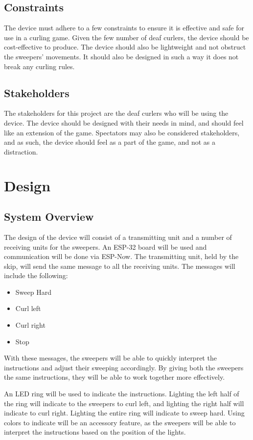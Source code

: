 \documentclass{article}
\begin{document}
\subsection{Constraints}

The device must adhere to a few constraints to ensure it is effective and safe for use in a curling game. Given the few number of deaf curlers, the device should be cost-effective to produce. The device should also be lightweight and not obstruct the sweepers' movements. It should also be designed in such a way it does not break any curling rules.

\subsection{Stakeholders}
The stakeholders for this project are the deaf curlers who will be using the device. The device should be designed with their needs in mind, and should feel like an extension of the game. Spectators may also be considered stakeholders, and as such, the device should feel as a part of the game, and not as a distraction.

\section{Design}

\subsection{System Overview}
The design of the device will consist of a transmitting unit and a number of receiving units for the sweepers. An ESP-32 board will be used and communication will be done via ESP-Now. The transmitting unit, held by the skip, will send the same message to all the receiving units. The messages will include the following:
\begin{itemize}
    \item Sweep Hard
    \item Curl left
    \item Curl right
    \item Stop
\end{itemize}

With these messages, the sweepers will be able to quickly interpret the instructions and adjust their sweeping accordingly. By giving both the sweepers the same instructions, they will be able to work together more effectively.

An LED ring will be used to indicate the instructions. Lighting the left half of the ring will indicate to the sweepers to curl left, and lighting the right half will indicate to curl right. Lighting the entire ring will indicate to sweep hard. Using colors to indicate will be an accessory feature, as the sweepers will be able to interpret the instructions based on the position of the lights.
\end{document}
